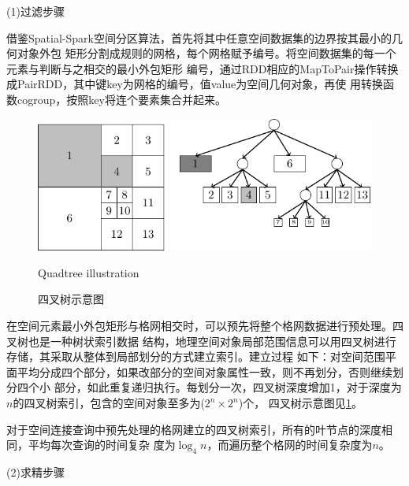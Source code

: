 (1)过滤步骤

借鉴Spatial-Spark空间分区算法，首先将其中任意空间数据集的边界按其最小的几何对象外包
矩形分割成规则的网格，每个网格赋予编号。将空间数据集的每一个元素与判断与之相交的最小外包矩形
编号，通过RDD相应的MapToPair操作转换成PairRDD，其中键key为网格的编号，值value为空间几何对象，再使
用转换函数cogroup，按照key将连个要素集合并起来。
\begin{figure}
\centering
\includegraphics[scale=0.8]{figures/quadtree.pdf}
\caption{四叉树示意图}{Quadtree illustration}
\label{fig:quadtree}
\end{figure}


在空间元素最小外包矩形与格网相交时，可以预先将整个格网数据进行预处理。四叉树也是一种树状索引数据
结构，地理空间对象局部范围信息可以用四叉树进行存储，其采取从整体到局部划分的方式建立索引。建立过程
如下：对空间范围平面平均分成四个部分，如果改部分的空间对象属性一致，则不再划分，否则继续划分四个小
部分，如此重复递归执行。每划分一次，四叉树深度增加1，对于深度为$n$的四叉树索引，包含的空间对象至多为($2^n \times 2^n$)个，
四叉树示意图见\ref{fig:quadtree}。

对于空间连接查询中预先处理的格网建立的四叉树索引，所有的叶节点的深度相同，平均每次查询的时间复杂
度为$\log_{4}n$，而遍历整个格网的时间复杂度为$n$。

(2)求精步骤


